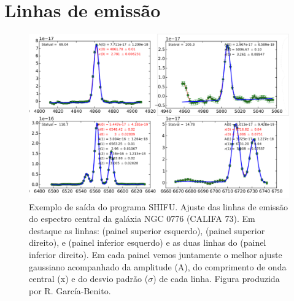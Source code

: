 \section{Linhas de emissão}
\label{sec:sample:eml}
\begin{figure}
	\centering
	\includegraphics[scale=0.6]{figuras/K0073_centralzone_HbO3HaN2S2.pdf}
	\caption[SHIFU: Exemplo de ajuste de linha de emissão]
	{Exemplo de saída do programa SHIFU. Ajuste das linhas de emissão do espectro central da galáxia NGC 0776 (CALIFA 73). Em destaque as linhas: \Hb (painel superior esquerdo), \oiii (painel superior direito), \nii e \Ha (painel inferior esquerdo) e as duas linhas do \sii (painel inferior direito). Em cada painel vemos juntamente o melhor ajuste gaussiano acompanhado da amplitude (A), do comprimento de onda central (x) e do desvio padrão ($\sigma$) de cada linha. Figura produzida por R. García-Benito.}
	\label{fig:rgbline}
\end{figure}

